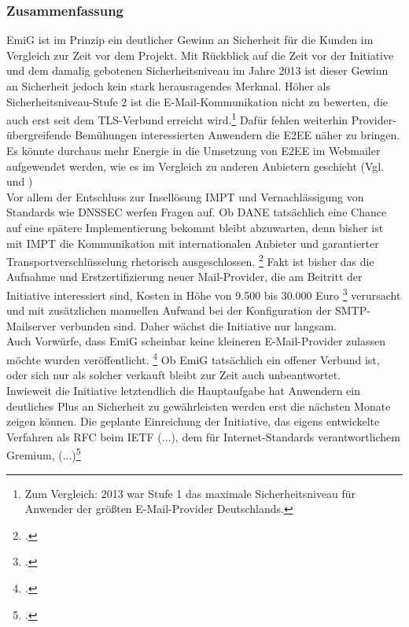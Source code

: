 \documentclass  [paper=a4,
				fontsize=12pt,
				listof=totoc,
				bibliography=totoc
				]{scrreprt}
\begin{document}
		\subsubsection{Zusammenfassung}
			\ac{EmiG} ist im Prinzip ein deutlicher Gewinn an Sicherheit für die Kunden im Vergleich zur Zeit vor dem Projekt. 
			Mit Rückblick auf die Zeit vor der Initiative und dem damalig gebotenen Sicherheitsniveau im Jahre 2013 ist dieser Gewinn an Sicherheit jedoch kein stark herausragendes Merkmal.
			Höher als Sicherheitsniveau-Stufe 2 ist die E-Mail-Kommunikation nicht zu bewerten, die auch erst seit dem \ac{TLS}-Verbund erreicht wird.\footnote{Zum Vergleich: 2013 war Stufe 1 das maximale Sicherheitsniveau für Anwender der größten E-Mail-Provider Deutschlands.}
			Dafür fehlen weiterhin Provider-übergreifende Bemühungen interessierten Anwendern die \ac{E2EE} näher zu bringen.
			Es könnte durchaus mehr Energie in die Umsetzung von \ac{E2EE} im Webmailer aufgewendet werden, wie es im Vergleich zu anderen Anbietern geschieht (Vgl.  und ) \medskip\\
			Vor allem der Entschluss zur Insellösung \ac{IMPT} und Vernachlässigung von Standards wie \ac{DNSSEC} werfen Fragen auf. 
			Ob \ac{DANE} tatsächlich eine Chance auf eine spätere Implementierung bekommt bleibt abzuwarten, denn bisher ist mit \ac{IMPT} die Kommunikation mit internationalen Anbieter und garantierter Transportverschlüsselung rhetorisch ausgeschlossen.
			\footcite[Vgl.][]{Zivadino14a}
			Fakt ist bisher das die Aufnahme und Erstzertifizierung neuer Mail-Provider, die am Beitritt der Initiative interessiert sind, Kosten in Höhe von 9.500 bis 30.000 Euro
			\footcite[Vgl.][]{Zivadino14c} 
			verursacht und mit zusätzlichen manuellen Aufwand bei der Konfiguration der \ac{SMTP}-Mailserver verbunden sind.
			Daher wächst die Initiative nur langsam.\\
			Auch Vorwürfe, dass \ac{EmiG} scheinbar keine kleineren E-Mail-Provider zulassen möchte wurden veröffentlicht.
			\footcite[Vgl.][]{Zivadino14d}
			Ob \ac{EmiG} tatsächlich ein offener Verbund ist, oder sich nur als solcher verkauft bleibt zur Zeit auch unbeantwortet. \medskip\\
			Inwieweit die Initiative letztendlich die Hauptaufgabe hat Anwendern ein deutliches Plus an Sicherheit zu gewährleisten werden erst die nächsten Monate zeigen können.
			Die geplante Einreichung der Initiative, das eigens entwickelte Verfahren als \ac{RFC} beim \ac{IETF} \glqq (...), dem für Internet-Standards verantwortlichem Gremium, (...)\grqq\footcite[][]{Zivadino14b}
\end{document}
